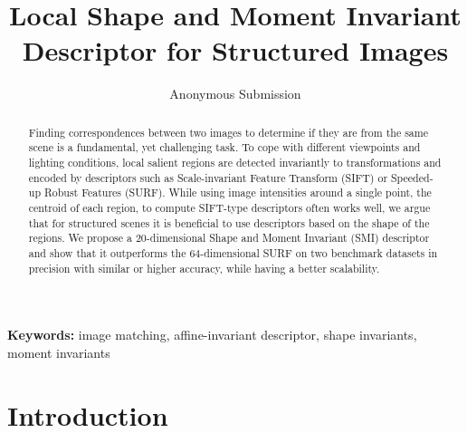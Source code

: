 \documentclass[a4paper,11pt]{article}
\begin{document}
\title{Local Shape and Moment Invariant Descriptor for Structured Images}

\author{Anonymous Submission}

\date{}
\maketitle
\thispagestyle{empty}



\begin{abstract}
Finding correspondences between two images to determine if they are from the same scene is a fundamental, yet challenging task. To cope with different viewpoints and lighting conditions, local salient regions are detected invariantly to transformations and encoded by descriptors such as Scale-invariant Feature Transform (SIFT) or Speeded-up Robust Features (SURF). While using image intensities around a single point, the centroid of each region, to compute SIFT-type descriptors often works well, we argue that for structured scenes it is beneficial to use descriptors based on the shape of the regions. We propose a $20$-dimensional Shape and Moment Invariant (SMI) descriptor and show that it outperforms the $64$-dimensional SURF on two benchmark datasets in  precision with similar or higher accuracy, while having a better scalability.
\end{abstract}
\textbf{Keywords:} image matching, affine-invariant descriptor, shape invariants, moment invariants



\section{Introduction}
\end{document}
